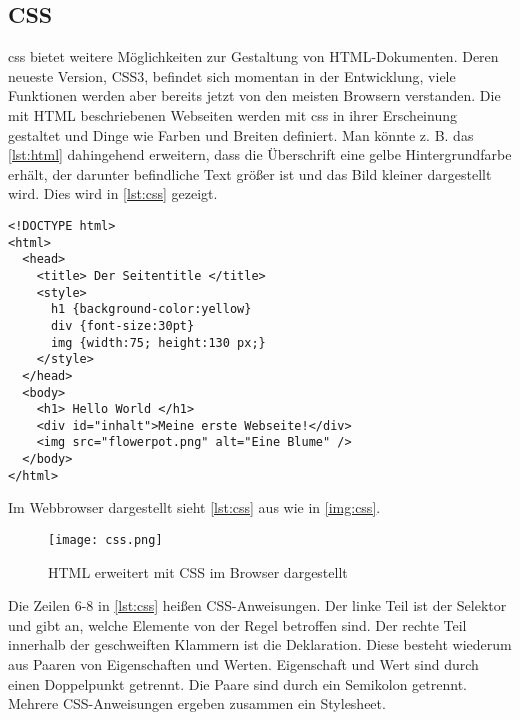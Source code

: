 \newpage\subsection{CSS}
\ac{css} bietet weitere Möglichkeiten zur Gestaltung von HTML-Dokumenten. Deren neueste Version, CSS3, befindet sich momentan in der Entwicklung, viele Funktionen werden aber bereits jetzt von den meisten Browsern verstanden. Die mit HTML beschriebenen Webseiten werden mit \ac{css} in ihrer Erscheinung gestaltet und Dinge wie Farben und Breiten definiert. Man könnte z. B. das \autoref{lst:html} dahingehend erweitern, dass die Überschrift eine gelbe Hintergrundfarbe erhält, der darunter befindliche Text größer ist und das Bild kleiner dargestellt wird. Dies wird in \autoref{lst:css} gezeigt.

\begin{lstlisting}[style=htmlcssjs, caption=Beispiel eines HTML-Dokumentes mit CSS, label=lst:css]
<!DOCTYPE html>
<html>
  <head>
    <title> Der Seitentitle </title>
    <style>
      h1 {background-color:yellow}
      div {font-size:30pt}
      img {width:75; height:130 px;}
    </style>
  </head>
  <body>
    <h1> Hello World </h1>
    <div id="inhalt">Meine erste Webseite!</div>
    <img src="flowerpot.png" alt="Eine Blume" />
  </body>
</html>
\end{lstlisting}

Im Webbrowser dargestellt sieht \autoref{lst:css} aus wie in \autoref{img:css}.

\begin{figure}[H]
	\begin{center}
		\texttt{[image: css.png]}
		\caption{HTML erweitert mit CSS im Browser dargestellt}
		\label{img:css}
	\end{center}
\end{figure}

Die Zeilen 6-8 in \autoref{lst:css} heißen CSS-Anweisungen. Der linke Teil ist der Selektor und gibt an, welche Elemente von der Regel betroffen sind. Der rechte Teil innerhalb der geschweiften Klammern ist die Deklaration. Diese besteht wiederum aus Paaren von Eigenschaften und Werten. Eigenschaft und Wert sind durch einen Doppelpunkt getrennt. Die Paare sind durch ein Semikolon getrennt. Mehrere CSS-Anweisungen ergeben zusammen ein Stylesheet.